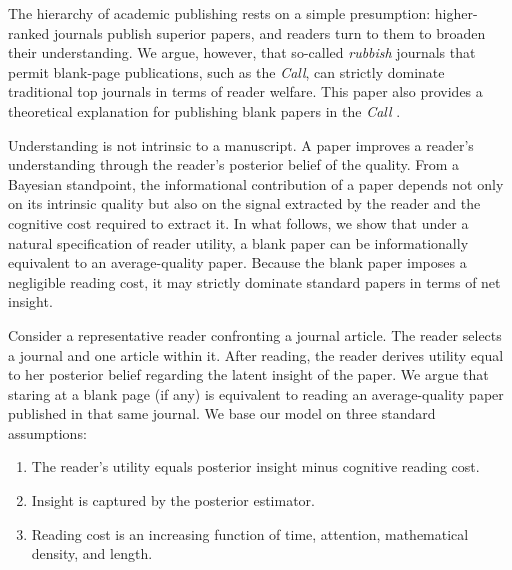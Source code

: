 \documentclass[AER]{AEA}
\begin{document}
\def\thefootnote{\arabic{footnote}}
\setcounter{footnote}{0}



The hierarchy of academic publishing rests on a simple presumption: higher-ranked journals publish superior papers, and readers turn to them to broaden their understanding. We argue, however, that so-called \textit{rubbish} journals that permit blank-page publications, such as the \textit{Call}, can strictly dominate traditional top journals in terms of reader welfare. This paper also provides a theoretical explanation for publishing blank papers in the \textit{Call} \citep{NoPaper2026}.

Understanding is not intrinsic to a manuscript. A paper improves a reader’s understanding through the reader's posterior belief of the quality. From a Bayesian standpoint, the informational contribution of a paper depends not only on its intrinsic quality but also on the signal extracted by the reader and the cognitive cost required to extract it. In what follows, we show that under a natural specification of reader utility, a blank paper can be informationally equivalent to an average-quality paper. Because the blank paper imposes a negligible reading cost, it may strictly dominate standard papers in terms of net insight.

Consider a representative reader confronting a journal article. The reader selects a journal and one article within it. After reading, the reader derives utility equal to her posterior belief regarding the latent insight of the paper. We argue that staring at a blank page (if any) is equivalent to reading an average-quality paper published in that same journal. We base our model on three standard assumptions:

\begin{enumerate}
    \item The reader’s utility equals posterior insight minus cognitive reading cost.
    \item Insight is captured by the posterior estimator.
    \item Reading cost is an increasing function of time, attention, mathematical density, and length.
\end{enumerate}
\end{document}
